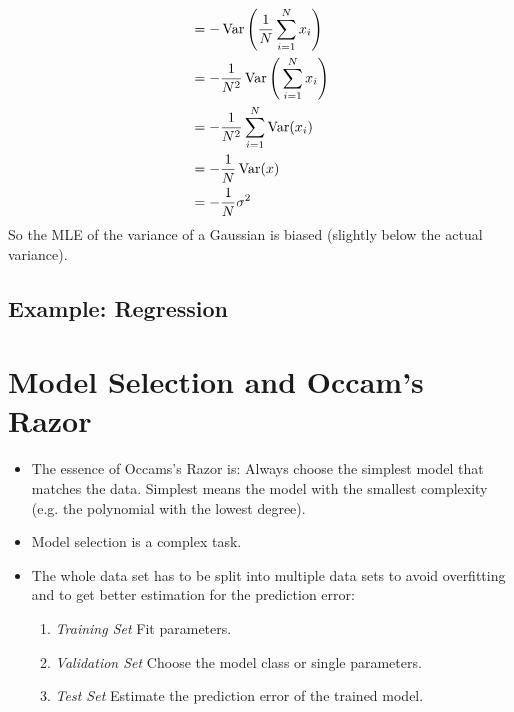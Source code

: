 \begin{align}
					                                            & = -\operatorname{Var}\Bigg( \frac{1}{N} \sum_{i = 1}^{N} x_i \Bigg)                                                  \\
					                                            & = -\frac{1}{N^2} \operatorname{Var}\Bigg( \sum_{i = 1}^{N} x_i \Bigg)                                                \\
					                                            & = -\frac{1}{N^2} \sum_{i = 1}^{N} \operatorname{Var}(x_i)                                                            \\
					                                            & = -\frac{1}{N} \operatorname{Var}(x)                                                                                 \\
					                                            & = -\frac{1}{N} \sigma^2
				\end{align}
				So the MLE of the variance of a Gaussian is biased (slightly below the actual variance).

		\subsection{Example: Regression} %

	\section{Model Selection and Occam's Razor}
		\label{sec:validation}

		\begin{itemize}
			\item The essence of Occams's Razor is: Always choose the simplest model that matches the data. Simplest means the model with the smallest complexity (e.g. the polynomial with the lowest degree).
			\item Model selection is a complex task.
			\item The whole data set has to be split into multiple data sets to avoid overfitting and to get better estimation for the prediction error:
				\begin{enumerate}
					\item \emph{Training Set}   \tabto{3cm} Fit parameters.
					\item \emph{Validation Set} \tabto{3cm} Choose the model class or single parameters.
					\item \emph{Test Set}       \tabto{3cm} Estimate the prediction error of the trained model.
				\end{enumerate}
		\end{itemize}


